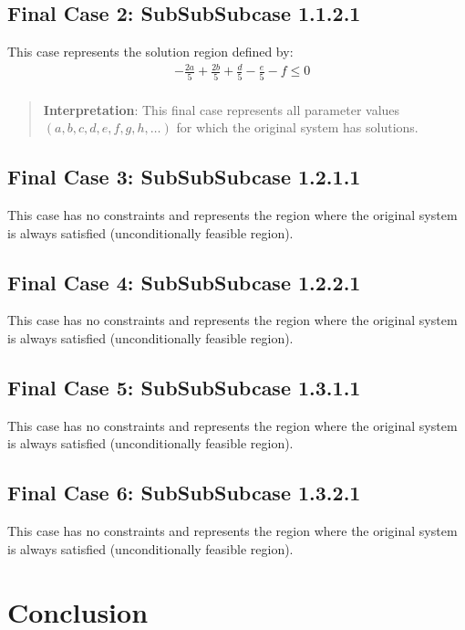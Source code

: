 \documentclass{article}
\newenvironment{stepdetail}
  {\begin{quote}\small\color{blue}}
  {\end{quote}}
\begin{document}
\subsection{Final Case 2: SubSubSubcase 1.1.2.1}

This case represents the solution region defined by:
\begin{align}
& - \frac{2 a}{5} + \frac{2 b}{5} + \frac{d}{5} - \frac{e}{5} - f \leq 0 \\
\end{align}

\begin{stepdetail}
\textbf{Interpretation}: This final case represents all parameter values
$(a, b, c, d, e, f, g, h, \ldots)$ for which the original system has solutions.
\end{stepdetail}

\subsection{Final Case 3: SubSubSubcase 1.2.1.1}

This case has no constraints and represents the region where the original
system is always satisfied (unconditionally feasible region).

\subsection{Final Case 4: SubSubSubcase 1.2.2.1}

This case has no constraints and represents the region where the original
system is always satisfied (unconditionally feasible region).

\subsection{Final Case 5: SubSubSubcase 1.3.1.1}

This case has no constraints and represents the region where the original
system is always satisfied (unconditionally feasible region).

\subsection{Final Case 6: SubSubSubcase 1.3.2.1}

This case has no constraints and represents the region where the original
system is always satisfied (unconditionally feasible region).

\section{Conclusion}
\end{document}
